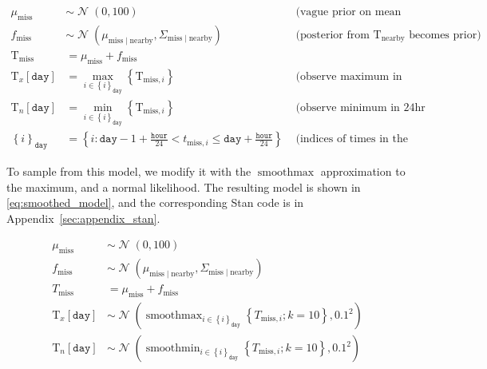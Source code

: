 \documentclass[letter]{article}
\def\lt{<}
\newcommand{\genericdel}[3]{%
      \left#1#3\right#2
    }
\newcommand{\del}[1]{\genericdel(){#1}}
\newcommand{\sbr}[1]{\genericdel[]{#1}}
\newcommand{\cbr}[1]{\genericdel\{\}{#1}}
\DeclareMathOperator{\normal}{\mathcal{N}}
\newcommand{\T}{\mathrm{T}}
\newcommand{\Tn}{\T_{n}}
\newcommand{\Tx}{\T_{x}}
\newcommand{\miss}{\mathrm{miss}}
\newcommand{\obs}{\mathrm{nearby}}
\newcommand{\hour}{\mathtt{hour}}
\DeclareMathOperator*{\softmax}{smoothmax}
\DeclareMathOperator*{\softmin}{smoothmin}
\newcommand{\iday}{\mathtt{day}}
\newcommand{\dayset}[1]{\cbr{i}_{#1}}
\newcommand{\eqlabel}[1]{\label{#1}}
\begin{document}
\begin{equation}
\eqlabel{eq:idealmodel}
\begin{aligned}
    \mu_{\miss} &\sim \normal\del{0,100} & \text{ (vague prior on mean temperature)} \\
    f_\miss &\sim \normal\del{\mu_{\miss \mid \obs}, \Sigma_{\miss \mid \obs}} & \text{ (posterior from $\T_\obs$ becomes prior)} \\
    \T_\miss &= \mu_\miss + f_\miss \\
    \Tx\sbr{\iday} &= \max_{i \in \dayset{\iday}}\cbr{ \T_{\miss,i}} & \text{ (observe maximum in 24hr window)}\\
    \Tn\sbr{\iday} &= \min_{i \in \dayset{\iday}}\cbr{ \T_{\miss,i}} & \text{ (observe minimum in 24hr window)}\\
    \dayset{\iday} &= \cbr{i : \iday-1+\frac{\hour}{24} \lt t_{\miss,i} \le \iday + \frac{\hour}{24}} & \text{ (indices of times in the 24hr window)}
\end{aligned}
\end{equation}
    


        To sample from this model, we modify it with the \(\softmax\) approximation to the maximum, and a normal likelihood. The resulting model is shown in \eqref{eq:smoothed_model}, and the corresponding Stan code is in Appendix~\ref{sec:appendix_stan}.

\begin{equation}
\eqlabel{eq:smoothed_model}
\begin{split}
    \mu_\miss &\sim \normal\del{0,100} \\
    f_\miss &\sim \normal\del{\mu_{\miss \mid \obs}, \Sigma_{\miss \mid \obs}} \\
    T_\miss &= \mu_\miss + f_\miss \\
    \Tx\sbr{\iday} &\sim \normal\del{\softmax_{i \in \dayset{\iday}} \cbr{ T_{\miss,i}; k=10}, 0.1^2} \\
    \Tn\sbr{\iday} &\sim \normal\del{\softmin_{i \in \dayset{\iday}} \cbr{ T_{\miss,i}; k=10}, 0.1^2}
\end{split}
\end{equation}
    
\end{document}
